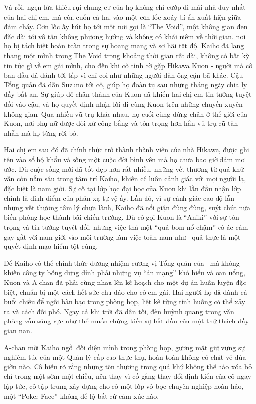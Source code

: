 \documentclass[../main.tex]{subfiles}
\begin{document}
Và rồi, ngọn lửa thiêu rụi chung cư của họ không chỉ cướp đi mái nhà duy nhất của hai chị em, mà còn cuốn cả hai vào một cơn lốc xoáy bí ẩn xuất hiện giữa đám cháy. Cơn lốc ấy hút họ tới một nơi gọi là ``The Void'', một không gian đen đặc dài tới vô tận không phương hướng và không có khái niệm về thời gian, nơi họ bị tách biệt hoàn toàn trong sự hoang mang và sợ hãi tột độ. Kaiho đã lang thang một mình trong The Void trong khoảng thời gian rất dài, không có bất kỳ tin tức gì về em gái mình, cho đến khi cô tình cờ gặp Hikawa Kuon - người mà cô ban đầu đã đánh tới tấp vì chỉ coi như những người đàn ông cặn bã khác. Cậu Tổng quản đã dẫn Suzuno tới cô, giúp họ đoàn tụ sau những tháng ngày chia ly đầy bất an. Sự giúp đỡ chân thành của Kuon đã khiến hai chị em tin tưởng tuyệt đối vào cậu, và họ quyết định nhận lời đi cùng Kuon trên những chuyến xuyên không gian. Qua nhiều vũ trụ khác nhau, họ cuối cùng dừng chân ở thế giới của Kuon, nơi phụ nữ được đối xử công bằng và tôn trọng hơn hẳn vũ trụ cũ tàn nhẫn mà họ từng rời bỏ.

Hai chị em sau đó đã chính thức trở thành thành viên của nhà Hikawa, được ghi tên vào sổ hộ khẩu và sống một cuộc đời bình yên mà họ chưa bao giờ dám mơ ước. Dù cuộc sống mới đã tốt đẹp hơn rất nhiều, những vết thương từ quá khứ vẫn còn nằm sâu trong tâm trí Kaiho, khiến cô luôn cảnh giác với mọi người lạ, đặc biệt là nam giới. Sự cố tại lớp học đại học của Kuon khi lần đầu nhận lớp chính là đỉnh điểm của phản xạ tự vệ ấy. Lần đó, vì sự cảnh giác cao độ lẫn những vết thương tâm lý chưa lành, Kaiho đã nổi giận đùng đùng, suýt chút nữa biến phòng học thành bãi chiến trường. Dù cô gọi Kuon là ``Aniki'' với sự tôn trọng và tin tưởng tuyệt đối, nhưng việc thả một ``quả bom nổ chậm'' có ác cảm gay gắt với nam giới vào môi trường làm việc toàn nam như \hls\ quả thực là một quyết định mạo hiểm tột cùng.

Để Kaiho có thể chính thức đương nhiệm cương vị Tổng quản của \hls\ mà không khiến công ty bỗng dưng dính phải những vụ ``án mạng'' khó hiểu và oan uổng, Kuon và A-chan đã phải cùng nhau lên kế hoạch cho một dự án huấn luyện đặc biệt, chuẩn bị một cách hết sức chu đáo cho cô em gái. Hai người họ đã dành cả buổi chiều để ngồi bàn bạc trong phòng họp, liệt kê từng tình huống có thể xảy ra và cách đối phó. Ngay cả khi trời đã dần tối, đèn huỳnh quang trong văn phòng vẫn sáng rực như thể muốn chứng kiến sự bắt đầu của một thử thách đầy gian nan.

A-chan mời Kaiho ngồi đối diện mình trong phòng họp, gương mặt giữ vững sự nghiêm túc của một Quản lý cấp cao thực thụ, hoàn toàn không có chút vẻ đùa giỡn nào. Cô hiểu rõ rằng những tổn thương trong quá khứ không thể nào xóa bỏ chỉ trong một sớm một chiều, nên thay vì cố gắng thay đổi định kiến của cô ngay lập tức, cô tập trung xây dựng cho cô một lớp vỏ bọc chuyên nghiệp hoàn hảo, một ``Poker Face'' không để lộ bất cứ cảm xúc nào.
\end{document}
